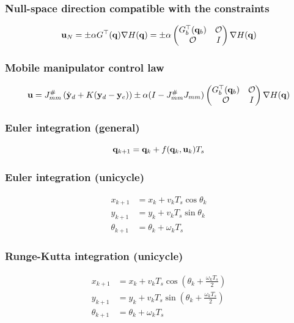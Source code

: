 \subsubsection{Null-space direction compatible with the constraints}
\begin{equation*}
    \mathbf u_N=\pm\alpha G^\top({\mathbf q})\nabla H({\mathbf q})=\pm\alpha\begin{pmatrix}G_b^\top({\mathbf q}_b)&\mathcal O\\\mathcal O&I\end{pmatrix}\nabla H({\mathbf q})
\end{equation*}

\subsubsection{Mobile manipulator control law}
\begin{equation*}
    \mathbf u=J_{mm}^\#\left({\dot{\mathbf y}}_d+K({\mathbf y}_d-{\mathbf y}_e)\right)\pm\alpha(I-J_{mm}^\#J_{mm})\begin{pmatrix}G_b^\top({\mathbf q}_b)&\mathcal O\\\mathcal O&I\end{pmatrix}\nabla H({\mathbf q})
\end{equation*}

\subsubsection{Euler integration (general)}
\begin{equation*}
    {\mathbf q}_{k+1}={\mathbf q}_k+f({\mathbf q}_k,\mathbf u_k)T_s
\end{equation*}

\subsubsection{Euler integration (unicycle)}
\begin{align*}
    x_{k+1}&=x_k+v_kT_s\cos\theta_k\\
    y_{k+1}&=y_k+v_kT_s\sin\theta_k\\
    \theta_{k+1}&=\theta_k+\omega_kT_s
\end{align*}

\subsubsection{Runge-Kutta integration (unicycle)}
\begin{align*}
    x_{k+1}&=x_k+v_kT_s\cos\left(\theta_k+\frac{\omega_kT_s}{2}\right)\\
    y_{k+1}&=y_k+v_kT_s\sin\left(\theta_k+\frac{\omega_kT_s}{2}\right)\\
    \theta_{k+1}&=\theta_k+\omega_kT_s
\end{align*}

